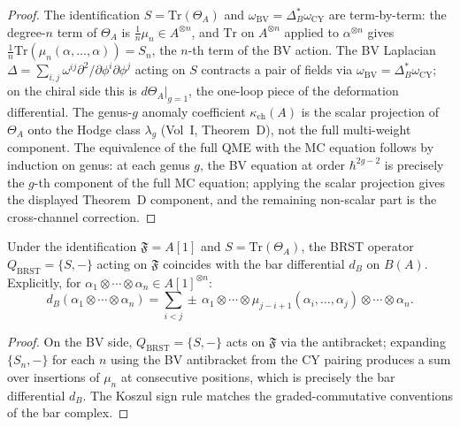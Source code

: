 \begin{proof}
The identification $S = \mathrm{Tr}(\Theta_A)$ and $\omega_{\mathrm{BV}} = \Delta_B^*\omega_{\mathrm{CY}}$ are term-by-term: the degree-$n$ term of $\Theta_A$ is $\frac{1}{n}\mu_n \in A^{\otimes n}$, and $\mathrm{Tr}$ on $A^{\otimes n}$ applied to $\alpha^{\otimes n}$ gives $\frac{1}{n}\mathrm{Tr}(\mu_n(\alpha,\ldots,\alpha)) = S_n$, the $n$-th term of the BV action. The BV Laplacian $\Delta = \sum_{i,j}\omega^{ij}\partial^2/\partial\phi^i\partial\phi^j$ acting on $S$ contracts a pair of fields via $\omega_{\mathrm{BV}} = \Delta_B^*\omega_{\mathrm{CY}}$; on the chiral side this is $d\Theta_A|_{g=1}$, the one-loop piece of the deformation differential. The genus-$g$ anomaly coefficient $\kappa_{\mathrm{ch}}(A)$ is the scalar projection of $\Theta_A$ onto the Hodge class $\lambda_g$ (Vol~I, Theorem~D), not the full multi-weight component. The equivalence of the full QME with the MC equation follows by induction on genus: at each genus $g$, the BV equation at order $\hbar^{2g-2}$ is precisely the $g$-th component of the full MC equation; applying the scalar projection gives the displayed Theorem~D component, and the remaining non-scalar part is the cross-channel correction.
\end{proof}

\begin{proposition}[Bar differential = BRST operator]
\label{prop:phys-bv-bar-brst}
Under the identification $\mathfrak{F} = A[1]$ and $S = \mathrm{Tr}(\Theta_A)$, the BRST operator $Q_{\mathrm{BRST}} = \{S, -\}$ acting on $\mathfrak{F}$ coincides with the bar differential $d_B$ on $B(A)$. Explicitly, for $\alpha_1 \otimes \cdots \otimes \alpha_n \in A[1]^{\otimes n}$:
\[
 d_B(\alpha_1 \otimes \cdots \otimes \alpha_n)
 = \sum_{i < j} \pm\, \alpha_1 \otimes \cdots \otimes \mu_{j-i+1}(\alpha_i, \ldots, \alpha_j) \otimes \cdots \otimes \alpha_n.
\]
\end{proposition}

\begin{proof}
On the BV side, $Q_{\mathrm{BRST}} = \{S,-\}$ acts on $\mathfrak{F}$ via the antibracket; expanding $\{S_n, -\}$ for each $n$ using the BV antibracket from the CY pairing produces a sum over insertions of $\mu_n$ at consecutive positions, which is precisely the bar differential $d_B$. The Koszul sign rule matches the graded-commutative conventions of the bar complex.
\end{proof}

